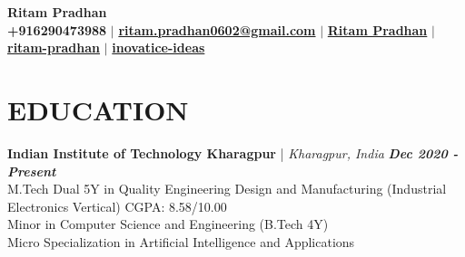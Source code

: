 \documentclass[a4paper,9pt]{extarticle}
\begin{document}


\pagestyle{fancy}
\renewcommand{\headrulewidth}{0pt}
\fancyhead{}
\thispagestyle{empty} %

\begin{center}
    \vspace{-0.8cm}
    \textbf{\huge Ritam Pradhan} \\ \vspace{2pt}
    \faPhone*
    \small \textbf{+916290473988} $\mid$
    \textbf{\href{mailto:ritam.pradhan2002@gmail.com}{ritam.pradhan0602@gmail.com}} $\mid$
    \faGraduationCap
    \textbf{\href{https://scholar.google.com/citations?user=2rvQymgAAAAJ&hl=en}{Ritam Pradhan}} 
    $\mid$
    \textbf{\href{https://www.linkedin.com/in/ritam-pradhan/}{ritam-pradhan}} 
    $\mid$
    \textbf{\href{https://github.com/inovatice-ideas}{inovatice-ideas}}
\end{center}

\section*{EDUCATION}
\vspace{-0.2cm}
\noindent
\textbf{Indian Institute of Technology Kharagpur} | \textit{Kharagpur, India} \hfill \textbf{\textit{Dec 2020 - Present}}\\ %
M.Tech Dual 5Y in Quality Engineering Design and Manufacturing (Industrial Electronics Vertical) \hfill CGPA: 8.58/10.00 \\ %
Minor in Computer Science and Engineering (B.Tech 4Y) \\
Micro Specialization in Artificial Intelligence and Applications \\ 
\vspace{-0.5cm}

\end{document}
